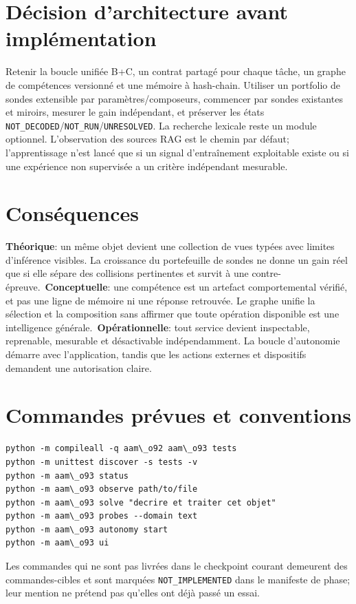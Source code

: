 \documentclass[11pt,a4paper,oneside]{report}
\begin{document}
\section{Décision d'architecture avant implémentation}
Retenir la boucle unifiée B+C, un contrat partagé pour chaque tâche, un graphe de compétences versionné et une mémoire à hash-chain. Utiliser un portfolio de sondes extensible par paramètres/composeurs, commencer par sondes existantes et miroirs, mesurer le gain indépendant, et préserver les états \texttt{NOT\_DECODED}/\texttt{NOT\_RUN}/\texttt{UNRESOLVED}. La recherche lexicale reste un module optionnel. L'observation des sources RAG est le chemin par défaut; l'apprentissage n'est lancé que si un signal d'entraînement exploitable existe ou si une expérience non supervisée a un critère indépendant mesurable.

\section{Conséquences}
\textbf{Théorique}: un même objet devient une collection de vues typées avec limites d'inférence visibles. La croissance du portefeuille de sondes ne donne un gain réel que si elle sépare des collisions pertinentes et survit à une contre-épreuve.\
\textbf{Conceptuelle}: une compétence est un artefact comportemental vérifié, et pas une ligne de mémoire ni une réponse retrouvée. Le graphe unifie la sélection et la composition sans affirmer que toute opération disponible est une intelligence générale.\
\textbf{Opérationnelle}: tout service devient inspectable, reprenable, mesurable et désactivable indépendamment. La boucle d'autonomie démarre avec l'application, tandis que les actions externes et dispositifs demandent une autorisation claire.

\section{Commandes prévues et conventions}
\begin{lstlisting}[basicstyle=\ttfamily\small,breaklines=true]
python -m compileall -q aam\_o92 aam\_o93 tests
python -m unittest discover -s tests -v
python -m aam\_o93 status
python -m aam\_o93 observe path/to/file
python -m aam\_o93 solve "decrire et traiter cet objet"
python -m aam\_o93 probes --domain text
python -m aam\_o93 autonomy start
python -m aam\_o93 ui
\end{lstlisting}
Les commandes qui ne sont pas livrées dans le checkpoint courant demeurent des commandes-cibles et sont marquées \texttt{NOT\_IMPLEMENTED} dans le manifeste de phase; leur mention ne prétend pas qu'elles ont déjà passé un essai.
\end{document}
